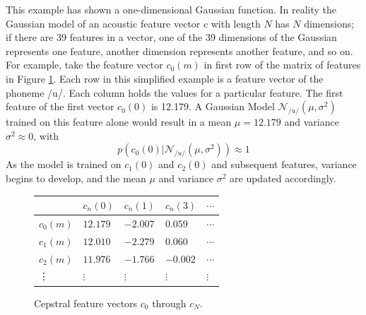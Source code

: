 This example has shown a one-dimensional Gaussian function.  In reality the Gaussian model of an acoustic feature vector $c$ with length $N$ has $N$ dimensions; if there are 39 features in a vector, one of the 39 dimensions of the Gaussian represents one feature, another dimension represents another feature, and so on.  For example, take the feature vector $c_0(m)$ in first row of the matrix of features in Figure \ref{fig:feat-vectors}.  Each row in this simplified example is a feature vector of the phoneme /u/.  Each column holds the values for a particular feature.  The first feature of the first vector $c_0(0)$ is 12.179.  A Gaussian Model $\mathcal{N}_{/u/}(\mu,\sigma^2)$ trained on this feature alone would result in a mean $\mu=12.179$ and variance $\sigma^2\approx 0$, with \begin{equation} p(c_0(0)|\mathcal{N}_{/u/}(\mu,\sigma^2))\approx 1 \end{equation}  As the model is trained on $c_1(0)$ and $c_2(0)$ and subsequent features, variance begins to develop, and the mean $\mu$ and variance $\sigma^2$ are updated accordingly.
%
\begin{figure}[H!]
\begin{center}
\begin{tabular}{|p{1.5cm}|p{1.5cm}|p{1.5cm}|p{1.5cm}|p{1cm}} \hline
    & $c_n(0)$ & $c_n(1)$ & $c_n(3)$ & $\cdots$ \\ \hline
$c_0(m)$ & $12.179$ & $-2.007$ & $0.059$ & $\cdots$ \\ \hline
$c_1(m)$ & $12.010$ & $-2.279$ & $0.060$ & $\cdots$ \\ \hline
$c_2(m)$ & $11.976$ & $-1.766$ & $-0.002$ & $\cdots$ \\ \hline
\vdots & $\vdots$ & $\vdots$ & $\vdots$ & $\vdots$ \\ 
\end{tabular}
\end{center}
\caption{Cepstral feature vectors $c_0$ through $c_N$.}\label{fig:feat-vectors}
\end{figure}

